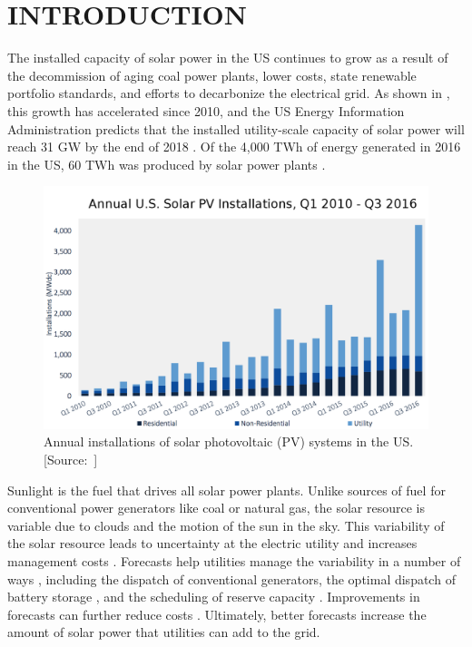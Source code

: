 \chapter{INTRODUCTION}
\label{chap:intro}

The installed capacity of solar power in the US continues to grow as a
result of the decommission of aging coal power plants, lower costs,
state renewable portfolio standards, and efforts to decarbonize the
electrical grid.
As shown in , this growth has accelerated since
2010, and the US Energy Information Administration predicts that the
installed utility-scale capacity of solar power will reach 31 GW by
the end of 2018 \citep{STEO2017}.
Of the 4,000 TWh of energy generated in 2016 in the US, 60 TWh was
produced by solar power plants \citep{EPM2017}.

\begin{figure}[htb]
  \includegraphics[width=\textwidth]{figs/solar_installations.png}
  \caption[Annual installations of solar PV in the US]{Annual
    installations of solar photovoltaic (PV) systems in the
    US. [Source:~\cite{GTM/SEIA2016}]}
\label{fig:solarinstall}
\end{figure}

Sunlight is the fuel that drives all solar power plants.
Unlike sources of fuel for conventional power generators like coal or
natural gas, the solar resource is variable due to clouds and the
motion of the sun in the sky.
This variability of the solar resource leads to uncertainty at the
electric utility and increases management costs \citep{Joskow2011}.
Forecasts help utilities manage the variability in a number of ways
\citep{Kleissl2013,Inman2013}, including the dispatch of conventional
generators, the optimal dispatch of battery storage
\citep{Cormode2015}, and the scheduling of reserve capacity
\citep{Kaur2016}.
Improvements in forecasts can further reduce costs
\citep{BrancucciMartinez-Anido2016}.
Ultimately, better forecasts increase the amount of solar power that
utilities can add to the grid.

